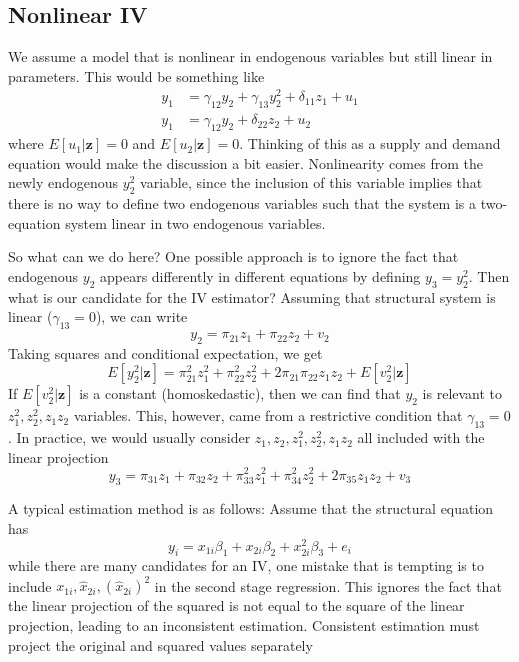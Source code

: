 \documentclass[12pt]{article}
\theoremstyle{definition}
\theoremstyle{property}
\theoremstyle{assumption}
\theoremstyle{example}
\theoremstyle{comment}
\begin{document}
\subsection{Nonlinear IV}
We assume a model that is nonlinear in endogenous variables but still linear in parameters. This would be something like
\[
\begin{aligned}
y_{1}&=\gamma_{12}y_{2}+\gamma_{13}y_{2}^2+\delta_{11}z_1+u_1\\
y_{1}&=\gamma_{12}y_{2}+\delta_{22}z_2+u_2
\end{aligned}
\]
where $E[u_1|\mathbf{z}]=0$ and $E[u_2|\mathbf{z}]=0$. Thinking of this as a supply and demand equation would make the discussion a bit easier. Nonlinearity comes from the newly endogenous $y_2^2$ variable, since the inclusion of this variable implies that there is no way to define two endogenous variables such that the system is a two-equation system linear in two endogenous variables. 
\par
So what can we do here? One possible approach is to ignore the fact that endogenous $y_2$ appears differently in different equations by defining $y_3 = y_2^2$. Then what is our candidate for the IV estimator? Assuming that structural system is linear ($\gamma_{13}=0$), we can write
\[
y_2 = \pi_{21}z_1+\pi_{22}z_2+v_2
\]
Taking squares and conditional expectation, we get
\[
E[y_2^2|\mathbf{z}]=\pi_{21}^2z_1^2+\pi_{22}^2z_2^2+2\pi_{21}\pi_{22}z_1z_2+E[v_2^2|\mathbf{z}]
\]
If $E[v_2^2|\mathbf{z}]$ is a constant (homoskedastic), then we can find that $y_2$ is relevant to $z_1^2, z_2^2, z_1z_2$ variables. This, however, came from a restrictive condition that $\gamma_{13}=0$. In practice, we would usually consider $z_1,z_2,z_1^2, z_2^2, z_1z_2$ all included with the linear projection
\[
y_3=\pi_{31}z_1+\pi_{32}z_2+\pi_{33}^2z_1^2+\pi_{34}^2z_2^2+2\pi_{35}z_1z_2+v_3
\]
\par
A typical estimation method is as follows: Assume that the structural equation has
\[
y_i=x_{1i}\beta_1+x_{2i}\beta_2+x_{2i}^2\beta_3+e_i
\]
while there are many candidates for an IV, one mistake that is tempting is to include $x_{1i}, \hat{x}_{2i}, (\hat{x}_{2i})^2$ in the second stage regression. This ignores the fact that the linear projection of the squared is not equal to the square of the linear projection, leading to an inconsistent estimation. Consistent estimation must project the original and squared values separately
\end{document}
